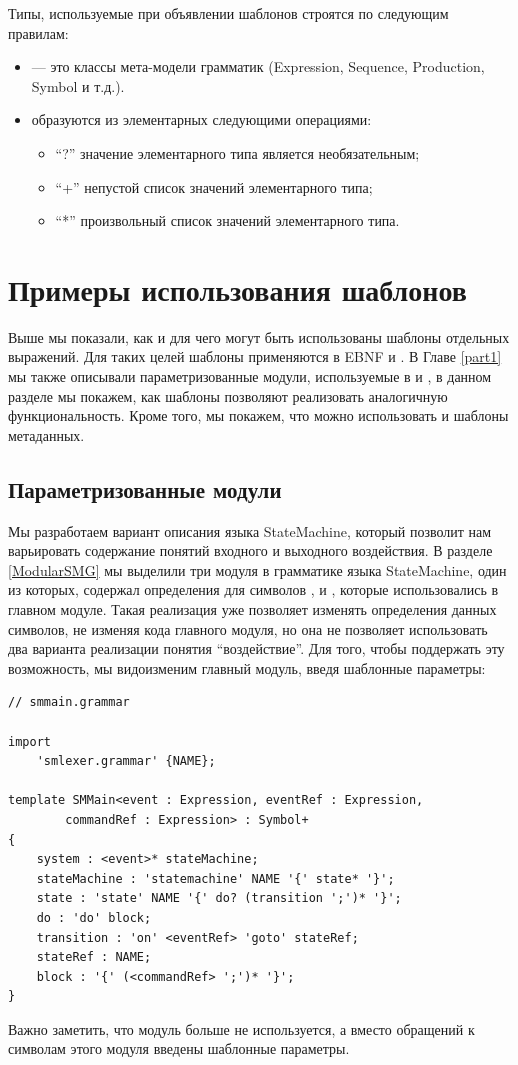 Типы, используемые при объявлении шаблонов строятся по следующим правилам: 
\begin{itemize}
\item {} --- это классы мета-модели грамматик (Expression, Sequence, Production, Symbol и т.д.).
\item {} образуются из элементарных следующими операциями:
	\begin{itemize}
		\item ``?'' значение элементарного типа является необязательным;
		\item ``+'' непустой список значений элементарного типа;
		\item ``*'' произвольный список значений элементарного типа.
	\end{itemize}
\end{itemize}

\section{Примеры использования шаблонов}

Выше мы показали, как и для чего могут быть использованы шаблоны отдельных выражений. Для таких целей шаблоны применяются в EBNF \cite{???} и  \cite{???}. В Главе \ref{part1} мы также описывали параметризованные модули, используемые в  и , в данном разделе мы покажем, как шаблоны  позволяют реализовать аналогичную функциональность. Кроме того, мы покажем, что можно использовать и шаблоны метаданных.

\subsection{Параметризованные модули}

Мы разработаем вариант описания языка StateMachine, который позволит нам варьировать содержание понятий входного и выходного воздействия. В разделе \ref{ModularSMG} мы выделили три модуля в грамматике языка StateMachine, один из которых,  содержал определения для символов ,  и , которые использовались в главном модуле. Такая реализация уже позволяет изменять определения данных символов, не изменяя кода главного модуля, но она не позволяет использовать  два варианта реализации понятия ``воздействие''. Для того, чтобы поддержать эту возможность, мы видоизменим главный модуль, введя шаблонные параметры:
\begin{lstlisting}
// smmain.grammar

import 
	'smlexer.grammar' {NAME};

template SMMain<event : Expression, eventRef : Expression, 
		commandRef : Expression> : Symbol+ 
{
	system : <event>* stateMachine;
	stateMachine : 'statemachine' NAME '{' state* '}';
	state : 'state' NAME '{' do? (transition ';')* '}';
	do : 'do' block;
	transition : 'on' <eventRef> 'goto' stateRef;
	stateRef : NAME;
	block : '{' (<commandRef> ';')* '}';
}
\end{lstlisting}
Важно заметить, что модуль  больше не используется, а вместо обращений к символам этого модуля введены шаблонные параметры.

